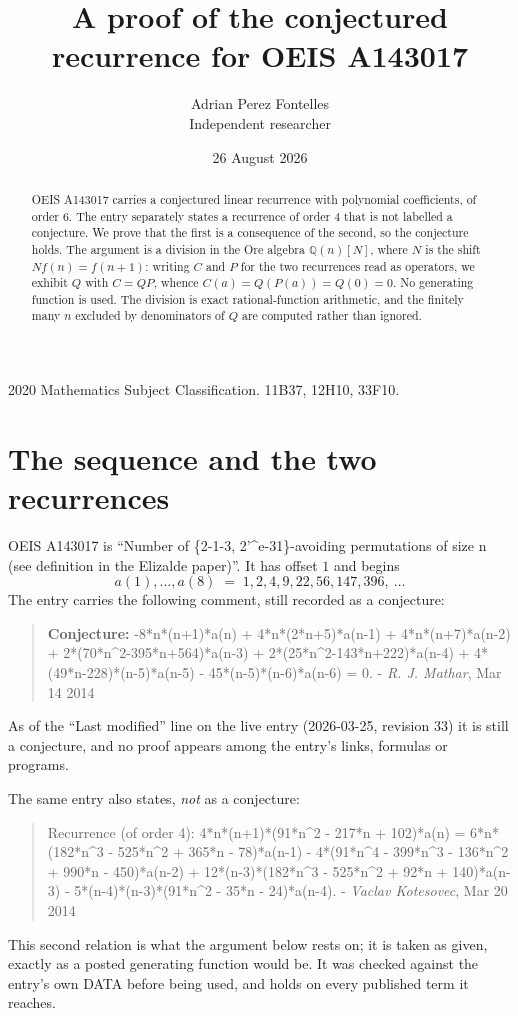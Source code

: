 \documentclass[11pt,a4paper]{article}
\title{A proof of the conjectured recurrence for OEIS A143017}
\author{Adrian Perez Fontelles\\ \small Independent researcher}
\date{26 August 2026}
\theoremstyle{plain}
\theoremstyle{definition}
\begin{document}
\maketitle

\begin{abstract}
OEIS A143017 carries a conjectured linear recurrence with polynomial coefficients, of
order 6. The entry separately states a recurrence of order 4 that is not
labelled a conjecture. We prove that the first is a consequence of the second, so the
conjecture holds. The argument is a division in the Ore algebra
$\mathbb{Q}(n)[N]$, where $N$ is the shift $Nf(n)=f(n+1)$: writing $C$ and $P$ for the two
recurrences read as operators, we exhibit $Q$ with $C=QP$, whence
$C(a)=Q(P(a))=Q(0)=0$. No generating function is used. The division is exact
rational-function arithmetic, and the finitely many $n$ excluded by denominators of $Q$
are computed rather than ignored.
\end{abstract}

\noindent\small 2020 Mathematics Subject Classification. 11B37, 12H10, 33F10.\normalsize

\section{The sequence and the two recurrences}

OEIS A143017 is ``Number of \{2-1-3, 2'\^{}e-31\}-avoiding permutations of size n (see definition in the Elizalde paper)''. It has offset $1$ and begins
\[
a(1),\dots,a(8)\;=\;1, 2, 4, 9, 22, 56, 147, 396,\ \dots
\]
The entry carries the following comment, still recorded as a conjecture:
\begin{quote}\small
\textbf{Conjecture:} -8*n*(n+1)*a(n) + 4*n*(2*n+5)*a(n-1) + 4*n*(n+7)*a(n-2) + 2*(70*n\^{}2-395*n+564)*a(n-3) + 2*(25*n\^{}2-143*n+222)*a(n-4) + 4*(49*n-228)*(n-5)*a(n-5) - 45*(n-5)*(n-6)*a(n-6) = 0. - \emph{R. J. Mathar}, Mar 14 2014
\end{quote}
As of the ``Last modified'' line on the live entry (2026-03-25, revision 33) it is still
a conjecture, and no proof appears among the entry's links, formulas or programs.

The same entry also states, \emph{not} as a conjecture:
\begin{quote}\small
Recurrence (of order 4): 4*n*(n+1)*(91*n\^{}2 - 217*n + 102)*a(n) = 6*n*(182*n\^{}3 - 525*n\^{}2 + 365*n - 78)*a(n-1) - 4*(91*n\^{}4 - 399*n\^{}3 - 136*n\^{}2 + 990*n - 450)*a(n-2) + 12*(n-3)*(182*n\^{}3 - 525*n\^{}2 + 92*n + 140)*a(n-3) - 5*(n-4)*(n-3)*(91*n\^{}2 - 35*n - 24)*a(n-4). - \emph{Vaclav Kotesovec}, Mar 20 2014
\end{quote}
This second relation is what the argument below rests on; it is taken as given, exactly as
a posted generating function would be. It was checked against the entry's own DATA before
being used, and holds on every published term it reaches.
\end{document}
